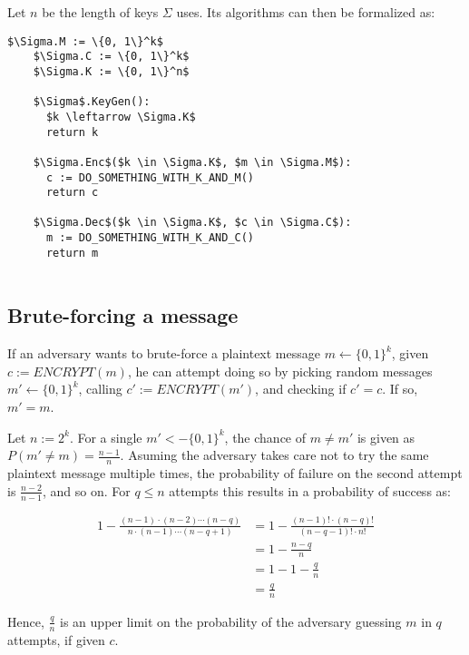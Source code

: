 \documentclass[a4paper]{scrreprt}
\begin{document}
 Let $n$ be the length of keys $\Sigma$ uses. Its algorithms can then be
 formalized as:

\begin{lstlisting}[mathescape=true, frame=single]
	$\Sigma.M := \{0, 1\}^k$
	$\Sigma.C := \{0, 1\}^k$
	$\Sigma.K := \{0, 1\}^n$

	$\Sigma$.KeyGen():
	  $k \leftarrow \Sigma.K$
	  return k

	$\Sigma.Enc$($k \in \Sigma.K$, $m \in \Sigma.M$):
	  c := DO_SOMETHING_WITH_K_AND_M()
	  return c

	$\Sigma.Dec$($k \in \Sigma.K$, $c \in \Sigma.C$):
	  m := DO_SOMETHING_WITH_K_AND_C()
	  return m
	
\end{lstlisting}


\subsection{Brute-forcing a message}

If an adversary wants to brute-force a plaintext message $m \leftarrow \{0,
1\}^k$, given $c := ENCRYPT(m)$, he can attempt doing so by picking random
messages $m' \leftarrow \{0, 1\}^k$, calling $c' := ENCRYPT(m')$, and checking
if $c' = c$. If so, $m' = m$.

Let $n := 2^k$. For a single $m' <- \{0, 1\}^k$, the chance of $m \neq m'$ is
given as  $P(m' \neq m) = \frac{n-1}{n}$. Asuming the adversary takes care not
to try the same plaintext message multiple times, the probability of failure on
the second attempt is $\frac{n - 2}{n - 1}$, and so on. For $q \leq n$ attempts
this results in a probability of success as:

\begin{align*}
	1 - \frac{(n - 1) \cdot (n - 2) \cdots (n - q)}{n \cdot (n-1) \cdots (n - q + 1)} 
	  & = 1 - \frac{(n-1)! \cdot (n - q)!}{(n - q - 1)! \cdot n!} \\
	  & = 1 - \frac{n - q}{n} \\
	  & = 1 - 1 - \frac{q}{n} \\
	  & = \frac{q}{n}
\end{align*}

Hence, $\frac{q}{n}$ is an upper limit on the probability of the adversary
guessing $m$ in $q$ attempts, if given $c$.
\end{document}
